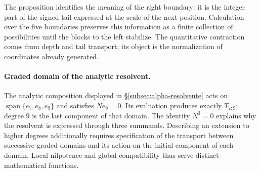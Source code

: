 The proposition identifies the meaning of the right boundary: it is the
integer part of the signed tail expressed at the scale of the next
position. Calculation over the five boundaries preserves this information
as a finite collection of possibilities until the blocks to the
left stabilize. The quantitative contraction comes from depth and
tail transport; its object is the normalization of
coordinates already generated.

\paragraph{Graded domain of the analytic resolvent.}
\label{ampl-alfa-dominio-resolvente}
The analytic composition displayed in
\S\ref{subsec:alpha-resolvente} acts on
$\operatorname{span}\{e_7,e_8,e_9\}$ and satisfies $Ne_9=0$. Its
evaluation produces exactly $T_{7:9}$; degree $9$ is the last
component of that domain. The identity $N^3=0$ explains why the
resolvent is expressed through three summands. Describing an
extension to higher degrees additionally requires specification of the
transport between successive graded domains and its action on the
initial component of each domain. Local nilpotence and global
compatibility thus serve distinct mathematical functions.
